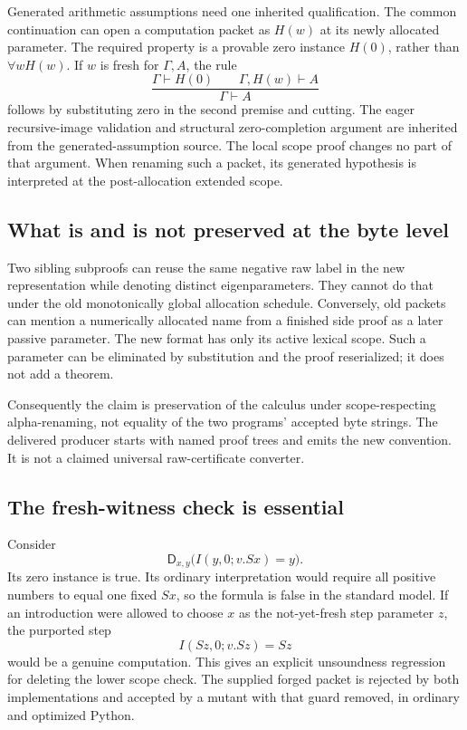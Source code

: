 \documentclass[11pt,letterpaper]{article}
\theoremstyle{definition}\newtheorem{definition}[theorem]{Definition}
\theoremstyle{remark}\newtheorem{remark}[theorem]{Remark}
\newcommand{\D}{\mathsf D}
\begin{document}
Generated arithmetic assumptions need one inherited qualification.
The common continuation can open a computation packet as $H(w)$ at
its newly allocated parameter. The required property is a provable
zero instance $H(0)$, rather than $\forall wH(w)$. If $w$ is fresh
for $\Gamma,A$, the rule
\[
 \frac{\Gamma\vdash H(0)\qquad\Gamma,H(w)\vdash A}
      {\Gamma\vdash A}
\]
follows by substituting zero in the second premise and cutting. The
eager recursive-image validation and structural zero-completion
argument are inherited from the generated-assumption source. The
local scope proof changes no part of that argument. When renaming
such a packet, its generated hypothesis is interpreted at the
post-allocation extended scope.

\subsection{What is and is not preserved at the byte level}

Two sibling subproofs can reuse the same negative raw label in the
new representation while denoting distinct eigenparameters. They
cannot do that under the old monotonically global allocation schedule.
Conversely, old packets can mention a numerically allocated name from
a finished side proof as a later passive parameter. The new format
has only its active lexical scope. Such a parameter can be eliminated
by substitution and the proof reserialized; it does not add a theorem.

Consequently the claim is preservation of the calculus under
scope-respecting alpha-renaming, not equality of the two programs'
accepted byte strings. The delivered producer starts with named proof
trees and emits the new convention. It is not a claimed universal
raw-certificate converter.

\subsection{The fresh-witness check is essential}

Consider
\[
                 \D_{x,y}\bigl(I(y,0;v.Sx)=y\bigr).
\]
Its zero instance is true. Its ordinary interpretation would require
all positive numbers to equal one fixed $Sx$, so the formula is false
in the standard model. If an introduction were allowed to choose
$x$ as the not-yet-fresh step parameter $z$, the purported step
\[
                    I(Sz,0;v.Sz)=Sz
\]
would be a genuine computation. This gives an explicit unsoundness
regression for deleting the lower scope check. The supplied forged
packet is rejected by both implementations and accepted by a mutant
with that guard removed, in ordinary and optimized Python.
\end{document}
